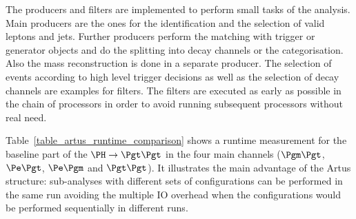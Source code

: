 \documentclass[3p]{elsarticle}
\begin{document}
The producers and filters are implemented to perform small tasks of the analysis. Main producers are the ones for the identification and the selection of valid leptons and jets. Further producers perform the matching with trigger or generator objects and do the splitting into decay channels or the categorisation. Also the mass reconstruction is done in a separate producer. The selection of events according to high level trigger decisions as well as the selection of decay channels are examples for filters. The filters are executed as early as possible in the chain of processors in order to avoid running subsequent processors without real need.

Table~\ref{table_artus_runtime_comparison} shows a runtime measurement for the baseline part of the $\PH\to\Pgt\Pgt$ in the four main channels ($\Pgm\Pgt$, $\Pe\Pgt$, $\Pe\Pgm$ and $\Pgt\Pgt$). It illustrates the main advantage of the Artus structure: sub-analyses with different sets of configurations can be performed in the same run avoiding the multiple IO overhead when the configurations would be performed sequentially in different runs.
\end{document}
